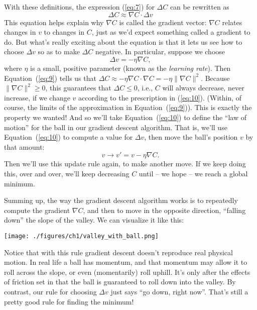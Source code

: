 \documentclass[a4paper,twoside,10pt]{book}
\begin{document}
With these definitions, the expression (\ref{eq:7}) for $\Delta C$ can be rewritten as
\begin{equation}
	\Delta C \approx \nabla C \cdot \Delta v
	\tag{9}\label{eq:9}
\end{equation}
This equation helps explain why $\nabla C$ is called the gradient vector: $\nabla C$ relates changes in $v$ to changes in $C$, just as we'd expect something called a gradient to do. But what's really exciting about the equation is that it lets us see how to choose $\Delta v$ so as to make $\Delta C$ negative. In particular, suppose we choose
\begin{equation}
	 \Delta v = -\eta \nabla C,
	 \tag{10}\label{eq:10}
\end{equation}
where $\eta$ is a small, positive parameter (known as the \textit{learning rate}). Then Equation~(\ref{eq:9}) tells us that $ \Delta C \approx -\eta \nabla C \cdot \nabla C = -\eta \|\nabla C\|^2$. Because $\| \nabla C\|^2 \geq 0$, this guarantees that $\Delta C \leq 0$, i.e., $C$ will always decrease, never increase, if we change $v$ according to the prescription in (\ref{eq:10}). (Within, of course, the limits of the approximation in Equation~(\ref{eq:9})). This is exactly the property we wanted! And so we'll take Equation~(\ref{eq:10}) to define the ``law of motion'' for the ball in our gradient descent algorithm. That is, we'll use Equation~(\ref{eq:10}) to compute a value for $\Delta v$, then move the ball's position $v$ by that amount:
\begin{equation}
v \to v' = v -\eta \nabla C. \tag{11}\label{eq:11}
\end{equation}
Then we'll use this update rule again, to make another move. If we keep doing this, over and over, we'll keep decreasing $C$ until -- we hope -- we reach a global minimum.

Summing up, the way the gradient descent algorithm works is to repeatedly compute the gradient $\nabla C$, and then to move in the opposite direction, ``falling down'' the slope of the valley. We can visualize it like this:
\begin{center}
	\texttt{[image: ./figures/ch1/valley\_with\_ball.png]}
\end{center}
Notice that with this rule gradient descent doesn't reproduce real physical motion. In real life a ball has momentum, and that momentum may allow it to roll across the slope, or even (momentarily) roll uphill. It's only after the effects of friction set in that the ball is guaranteed to roll down into the valley. By contrast, our rule for choosing $\Delta v$ just says ``go down, right now''. That's still a pretty good rule for finding the minimum!
\end{document}
